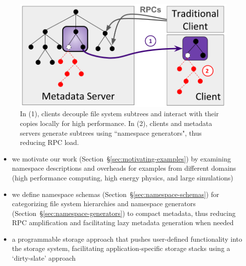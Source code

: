 \begin{figure}[t]
  \centering
  \includegraphics[width=0.9\linewidth]{figures/intro.png}
  \caption{In (1), clients decouple file system subtrees and interact with
their copies locally for high performance. In (2), clients and metadata servers
generate subtrees using ``namespace generators", thus reducing RPC load.
\label{fig:intro}}
\end{figure}

\begin{itemize}
  \setlength\itemsep{-0.5em}
\item we motivate our work (Section~\S\ref{sec:motivating-examples}) by
examining namespace descriptions and overheads for examples from different
domains (high performance computing, high energy physics, and large
simulations)
\item we define namespace schemas (Section~\S\ref{sec:namespace-schemas}) for
categorizing file system hierarchies and namespace generators
(Section~\S\ref{sec:namespace-generators}) to compact metadata, thus reducing
RPC amplification and facilitating lazy metadata generation when needed
\item a programmable storage approach that pushes user-defined functionality
into the storage system, facilitating application-specific storage stacks using
a `dirty-slate' approach
\end{itemize}
